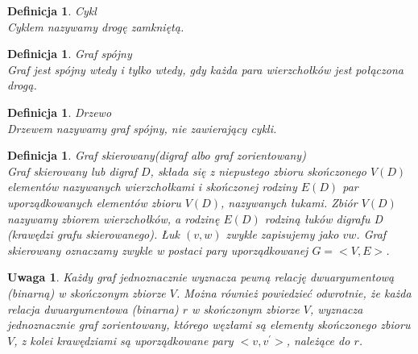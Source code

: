 \documentclass[12pt,a4paper]{report}
\newtheorem{definition}[theorem]{Definicja}
\newtheorem{uwaga}{Uwaga}
\begin{document}
\begin{definition}{Cykl \cite[Rozdział 3]{wilson2008}}\\
Cyklem nazywamy drogę zamkniętą.
\end{definition}


\begin{definition}{Graf spójny \cite[Rozdział 3]{wilson2008}}\\
Graf jest spójny wtedy i tylko wtedy, gdy każda para wierzchołków jest połączona drogą.
\end{definition}


\begin{definition}{Drzewo \cite[Rozdział 4]{wilson2008}}\\
Drzewem nazywamy graf spójny, nie zawierający cykli.
\end{definition}

\begin{definition}{Graf skierowany(digraf albo graf zorientowany) \cite[Rozdział 7]{wilson2008}}\\
Graf skierowany lub digraf $D$, składa się z niepustego zbioru skończonego $V(D)$ elementów nazywanych wierzchołkami i skończonej rodziny $E(D)$ par uporządkowanych elementów zbioru $V(D)$, nazywanych łukami. Zbiór $V(D)$ nazywamy zbiorem wierzchołków, a rodzinę $E(D)$ rodziną łuków digrafu D (krawędzi grafu skierowanego). Łuk $(v,w)$ zwykle zapisujemy jako $vw$. Graf skierowany oznaczamy zwykle w postaci pary uporządkowanej $G=<V,E>$.
\end{definition}

\begin{uwaga}
Każdy graf jednoznacznie wyznacza pewną relację dwuargumentową (binarną) w skończonym zbiorze $V$. Można również powiedzieć odwrotnie, że każda relacja dwuargumentowa (binarna) $r$ w skończonym zbiorze $V$, wyznacza jednoznacznie graf zorientowany, którego węzłami są elementy skończonego zbioru $V$, z kolei krawędziami są uporządkowane pary $<v,v^{'}>$, należące do $r$. 
\end{uwaga}
\end{document}
